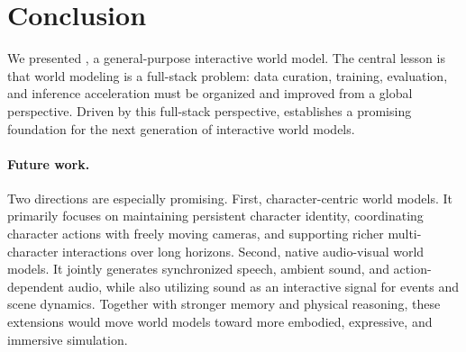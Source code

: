 \section{Conclusion}

We presented \method{},
a general-purpose interactive world model.
The central lesson is that world modeling is a full-stack problem: data curation, training, evaluation, and inference acceleration must be organized and improved from a global perspective. Driven by this full-stack perspective, \method{} establishes a promising foundation for the next generation of interactive world models.

\paragraph{Future work.}
Two directions are especially promising.
First, character-centric world models.
It primarily focuses on maintaining persistent character
identity, coordinating character actions with freely moving cameras, and supporting
richer multi-character interactions over long horizons.
Second, native audio-visual world models. It jointly generates synchronized
speech, ambient sound, and action-dependent audio, while also utilizing sound as an
interactive signal for events and scene dynamics.
Together with stronger memory and physical reasoning, these extensions would
move world models toward more embodied, expressive, and immersive simulation.
